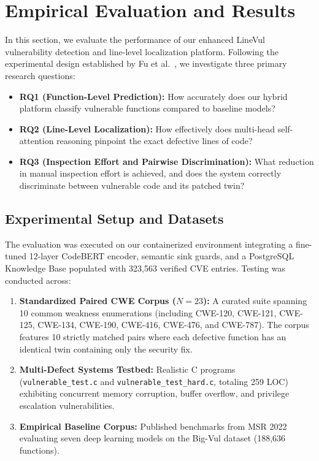 
\section{Empirical Evaluation and Results}
\label{sec:evaluation}

In this section, we evaluate the performance of our enhanced LineVul vulnerability detection and line-level localization platform. Following the experimental design established by Fu et al.~\cite{fu2022linevul}, we investigate three primary research questions:
\begin{itemize}
    \item \textbf{RQ1 (Function-Level Prediction):} How accurately does our hybrid platform classify vulnerable functions compared to baseline models?
    \item \textbf{RQ2 (Line-Level Localization):} How effectively does multi-head self-attention reasoning pinpoint the exact defective lines of code?
    \item \textbf{RQ3 (Inspection Effort and Pairwise Discrimination):} What reduction in manual inspection effort is achieved, and does the system correctly discriminate between vulnerable code and its patched twin?
\end{itemize}

\subsection{Experimental Setup and Datasets}
The evaluation was executed on our containerized environment integrating a fine-tuned 12-layer CodeBERT encoder, semantic sink guards, and a PostgreSQL Knowledge Base populated with 323,563 verified CVE entries. Testing was conducted across:
\begin{enumerate}
    \item \textbf{Standardized Paired CWE Corpus ($N=23$):} A curated suite spanning 10 common weakness enumerations (including CWE-120, CWE-121, CWE-125, CWE-134, CWE-190, CWE-416, CWE-476, and CWE-787). The corpus features 10 strictly matched pairs where each defective function has an identical twin containing only the security fix.
    \item \textbf{Multi-Defect Systems Testbed:} Realistic C programs (\texttt{vulnerable\_test.c} and \texttt{vulnerable\_test\_hard.c}, totaling 259 LOC) exhibiting concurrent memory corruption, buffer overflow, and privilege escalation vulnerabilities.
    \item \textbf{Empirical Baseline Corpus:} Published benchmarks from MSR 2022~\cite{fu2022linevul} evaluating seven deep learning models on the Big-Vul dataset (188,636 functions).
\end{enumerate}

